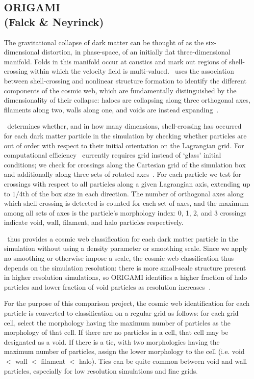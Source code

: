 \subsection{ORIGAMI \\ \hskip 0.85cm (Falck \& Neyrinck)}
\label{section:origami}

The gravitational collapse of dark matter can be thought of as the six-dimensional distortion, in phase-space, of an initially flat three-dimensional manifold. Folds in this manifold occur at caustics and mark out regions of shell-crossing within which the velocity field is multi-valued. \origami\ uses the association between shell-crossing and nonlinear structure formation to identify the different components of the cosmic web, which are fundamentally distinguished by the dimensionality of their collapse: haloes are collapsing along three orthogonal axes, filaments along two, walls along one, and voids are instead expanding~\citep{falck2012}. 

\origami\ determines whether, and in how many dimensions, shell-crossing has occurred for each dark matter particle in the simulation by checking whether particles are out of order with respect to their initial orientation on the Lagrangian grid. For computational efficiency \origami\ currently requires grid instead of `glass' initial conditions; we check for crossings along the Cartesian grid of the simulation box and additionally along three sets of rotated axes~\citep[for details see][]{falck2012}. For each particle we test for crossings with respect to all particles along a given Lagrangian axis, extending up to $1/4$th of the box size in each direction. The number of orthogonal axes along which shell-crossing is detected is counted for each set of axes, and the maximum among all sets of axes is the particle's morphology index: 0, 1, 2, and 3 crossings indicate void, wall, filament, and halo particles respectively.

\origami\ thus provides a cosmic web classification for each dark matter particle in the simulation without using a density parameter or smoothing scale. Since we apply no smoothing or otherwise impose a scale, the cosmic web classification thus depends on the simulation resolution: there is more small-scale structure present in higher resolution simulations, so ORIGAMI identifies a higher fraction of halo particles and lower fraction of void particles as resolution increases~\citep{falck2012,falck2015}.


For the purpose of this comparison project, the cosmic web identification for each particle is converted to classification on a regular grid as follows: for each grid cell, select the morphology having the maximum number of particles as the morphology of that cell. If there are no particles in a cell, that cell may be designated as a void. If there is a tie, with two morphologies having the maximum number of particles, assign the lower morphology to the cell (i.e. void $<$ wall $<$ filament $<$ halo). Ties can be quite common between void and wall particles, especially for low resolution simulations and fine grids.

